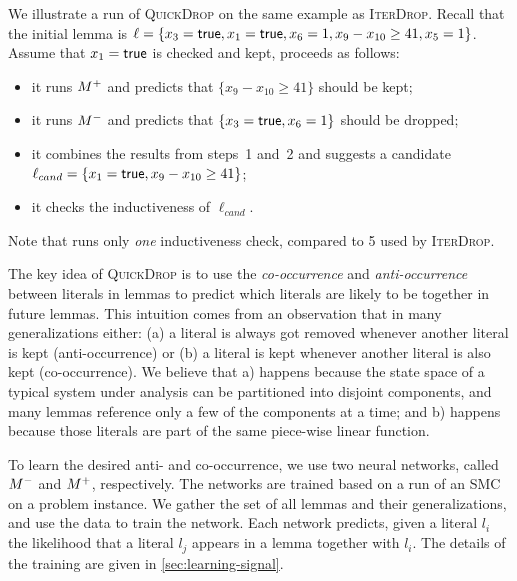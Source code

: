 We illustrate a run of \textsc{QuickDrop} on the same example as
\textsc{IterDrop}. Recall that the initial lemma is $\ell = \{x_3 =
\textsf{true}, x_1 = \textsf{true}, x_6 = 1, x_9 - x_{10} \geq 41, x_5 = 1\}$.
Assume that $x_1 = \textsf{true}$ is checked and kept, \tool proceeds as follows:
\begin{itemize}
\item it runs $M^+$ and predicts that $\{x_9 - x_{10} \geq 41\}$ should be kept;
\item it runs $M^-$ and predicts that $\{x_3 =
\textsf{true}, x_6 = 1\}$ should be dropped;
\item it combines the results from steps~1 and~2 and suggests a candidate $\ell_{cand}=\{x_1 =
  \textsf{true}, x_9 - x_{10} \geq 41\}$;
\item it checks the inductiveness of $\ell_{cand}$.
\end{itemize}
Note that \tool runs only \emph{one} inductiveness
check, compared to 5 used by \textsc{IterDrop}.





The key idea of \textsc{QuickDrop} is to use the \textit{co-occurrence} and
\textit{anti-occurrence} between literals in lemmas to predict which literals are
likely to be together in future lemmas. This intuition comes from an
observation that in many generalizations either: (a) a literal is
always got removed whenever another literal is kept (anti-occurrence) or (b) a
literal is kept whenever another literal is also kept (co-occurrence). We believe
that a) happens because the state space of a typical system under analysis can
be partitioned into disjoint components, and many lemmas reference only a few of
the components at a time; and b) happens because those literals are part of the same piece-wise linear function.

To learn the desired anti- and co-occurrence, we use two neural networks, called
$M^-$ and $M^+$, respectively. The networks are trained based on a run of an
SMC on a problem instance. We gather the set of all lemmas and their
generalizations, and use the data to train the network. Each network predicts,
given a literal $l_i$ the likelihood that a literal $l_j$ appears in a lemma
together with $l_i$. The details of the training are given in \cref{sec:learning-signal}.


